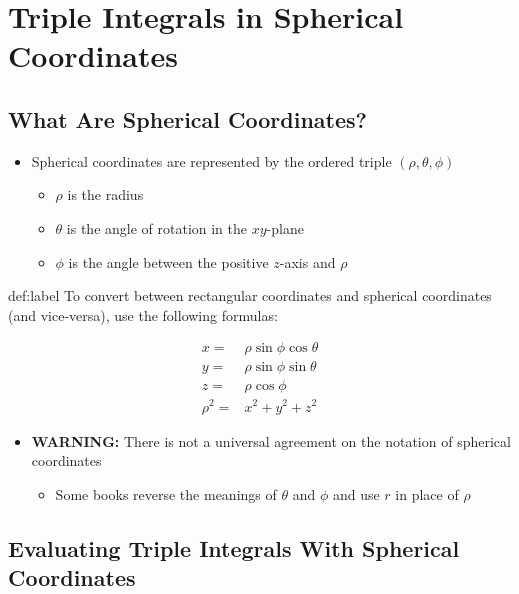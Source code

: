 \documentclass{package/notes}
\begin{document}
\section{Triple Integrals in Spherical Coordinates}


\subsection{What Are Spherical Coordinates?}

\begin{itemize}
	\item Spherical coordinates are represented by the ordered triple $(\rho,\theta,\phi)$
	\begin{itemize}
		\item $\rho$ is the radius
		\item $\theta$ is the angle of rotation in the $xy$-plane
		\item $\phi$ is the angle between the positive $z$-axis and $\rho$
	\end{itemize}
\end{itemize}

\begin{definition}{def:label} %
	To convert between rectangular coordinates and spherical coordinates (and vice-versa), use the following formulas:

	$$
	\begin{aligned}
		x =&\rho\sin\phi\cos\theta\\
		y=&\rho\sin\phi\sin\theta\\
		z=&\rho\cos\phi\\
		\rho^2=&x^2+y^2+z^2
	\end{aligned}
	$$
\end{definition}

\begin{itemize}
	\item \textbf{WARNING:} There is not a universal agreement on the notation of spherical coordinates
	\begin{itemize}
		\item Some books reverse the meanings of $\theta$ and $\phi$ and use $r$ in place of $\rho$
	\end{itemize}
\end{itemize}


\subsection{Evaluating Triple Integrals With Spherical Coordinates}
\end{document}
